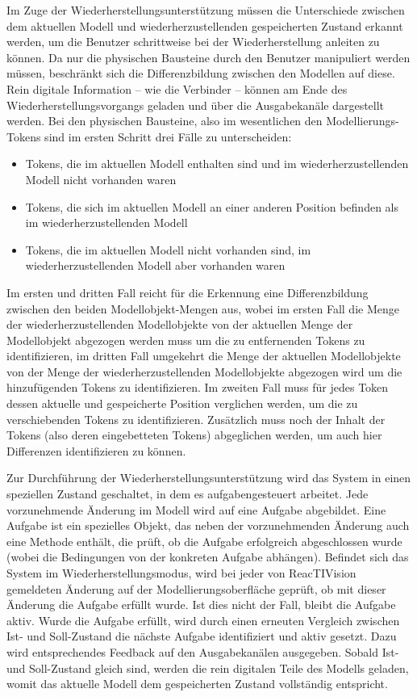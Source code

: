 Im Zuge der Wiederherstellungsunterstützung müssen die Unterschiede zwischen dem aktuellen Modell und wiederherzustellenden gespeicherten Zustand erkannt werden, um die Benutzer schrittweise bei der Wiederherstellung anleiten zu können. Da nur die physischen Bausteine durch den Benutzer manipuliert werden müssen, beschränkt sich die Differenzbildung zwischen den Modellen auf diese. Rein digitale Information -- wie die Verbinder -- können am Ende des Wiederherstellungsvorgangs geladen und über die Ausgabekanäle dargestellt werden. Bei den physischen Bausteine, also im wesentlichen den Modellierungs-Tokens sind im ersten Schritt drei Fälle zu unterscheiden:
\begin{itemize}
	\item Tokens, die im aktuellen Modell enthalten sind und im wiederherzustellenden Modell nicht vorhanden waren
	\item Tokens, die sich im aktuellen Modell an einer anderen Position befinden als im wiederherzustellenden Modell
	\item Tokens, die im aktuellen Modell nicht vorhanden sind, im wiederherzustellenden Modell aber vorhanden waren
\end{itemize}
Im ersten und dritten Fall reicht für die Erkennung eine Differenzbildung zwischen den beiden Modellobjekt-Mengen aus, wobei im ersten Fall die Menge der wiederherzustellenden Modellobjekte von der aktuellen Menge der Modellobjekt abgezogen werden muss um die zu entfernenden Tokens zu identifizieren, im dritten Fall umgekehrt die Menge der aktuellen Modellobjekte von der Menge der wiederherzustellenden Modellobjekte abgezogen wird um die hinzufügenden Tokens zu identifizieren. Im zweiten Fall muss für jedes Token dessen aktuelle und gespeicherte Position verglichen werden, um die zu verschiebenden Tokens zu identifizieren. Zusätzlich muss noch der Inhalt der Tokens (also deren eingebetteten Tokens) abgeglichen werden, um auch hier Differenzen identifizieren zu können.

Zur Durchführung der Wiederherstellungsunterstützung wird das System in einen speziellen Zustand geschaltet, in dem es aufgabengesteuert arbeitet. Jede vorzunehmende Änderung im Modell wird auf eine Aufgabe abgebildet. Eine Aufgabe ist ein spezielles Objekt, das neben der vorzunehmenden Änderung auch eine Methode enthält, die prüft, ob die Aufgabe erfolgreich abgeschlossen wurde (wobei die Bedingungen von der konkreten Aufgabe abhängen). Befindet sich das System im Wiederherstellungsmodus, wird bei jeder von ReacTIVision gemeldeten Änderung auf der Modellierungsoberfläche geprüft, ob mit dieser Änderung die Aufgabe erfüllt wurde. Ist dies nicht der Fall, bleibt die Aufgabe aktiv. Wurde die Aufgabe erfüllt, wird durch einen erneuten Vergleich zwischen Ist- und Soll-Zustand die nächste Aufgabe identifiziert und aktiv gesetzt. Dazu wird entsprechendes Feedback auf den Ausgabekanälen ausgegeben. Sobald Ist- und Soll-Zustand gleich sind, werden die rein digitalen Teile des Modells geladen, womit das aktuelle Modell dem gespeicherten Zustand vollständig entspricht. 

